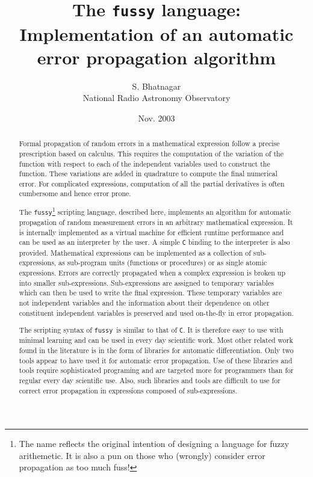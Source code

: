 \documentclass[12pt]{article}
\newcommand{\Fussy}{{\tt fussy}}
\newcommand{\PDFVersion}  {\htmladdnormallinkfoot{PDF version}{http://sanbee.github.io/fussy/fussy.pdf}}
\begin{document}
\title{The {\tt fussy} language: Implementation of an automatic
error propagation algorithm}
\author{S. Bhatnagar \\National Radio Astronomy Observatory}
\date{Nov. 2003}
\maketitle
\normalsize
\ifpdf
\else
\begin{center}
  \PDFVersion
\end{center}
\fi

\begin{abstract} 
Formal propagation of random errors in a mathematical expression
follow a precise prescription based on calculus.  This requires the
computation of the variation of the function with respect to each of
the independent variables used to construct the function.  These
variations are added in quadrature to compute the final numerical
error.  For complicated expressions, computation of all the partial
derivatives is often cumbersome and hence error prone.

The \Fussy\footnote{The name reflects the original intention of
  designing a language for fuzzy arithemetic.  It is also a pun on
  those who (wrongly) consider error propagation as too much fuss!}
scripting language, described here, implements an algorithm for
automatic propagation of random measurement errors in an arbitrary
mathematical expression.  It is internally implemented as a virtual
machine for efficient runtime performance and can be used as an
interpreter by the user.  A simple {\tt C} binding to the interpreter
is also provided.  Mathematical expressions can be implemented as a
collection of sub-expressions, as sub-program units (functions or
procedures) or as single atomic expressions.  Errors are correctly
propagated when a complex expression is broken up into smaller
sub-expressions.  Sub-expressions are assigned to temporary variables
which can then be used to write the final expression.  These temporary
variables are not independent variables and the information about
their dependence on other constituent independent variables is
preserved and used on-the-fly in error propagation.

The scripting syntax of \Fussy\ is similar to that of {\tt C}.  It is
therefore easy to use with minimal learning and can be used in every
day scientific work.  Most other related work found in the literature
is in the form of libraries for automatic differentiation.  Only two
tools appear to have used it for automatic error propagation.  Use of
these libraries and tools require sophisticated programing and are
targeted more for programmers than for regular every day scientific
use.  Also, such libraries and tools are difficult to use for correct
error propagation in expressions composed of sub-expressions.
\end{abstract}
            
\end{document}
